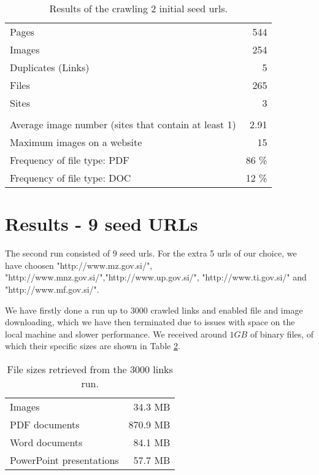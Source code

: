 \documentclass[9pt]{IEEEtran}
\begin{document}
\begin{table}[H]
    \begin{center}
    \caption{Results of the crawling 2 initial seed urls.}
        \begin{tabular}{ l | r }
        Pages & 544 \\
        Images & 254 \\
        Duplicates (Links) & 5 \\
        Files & 265 \\
        Sites & 3 \\
        \hline \\
        Average image number (sites that contain at least 1) & 2.91 \\
        Maximum images on a website & 15 \\
        Frequency of file type: PDF & 86 \% \\
        Frequency of file type: DOC & 12 \% \\
        \end{tabular}
    \label{tab:results2}
    \end{center}
\end{table}
\section{Results - 9 seed URLs}\label{sec:results2}
The second run consisted of 9 seed urls. For the extra 5 urls of our choice, we have choosen "http://www.mz.gov.si/", "http://www.mnz.gov.si/","http://www.up.gov.si/", "http://www.ti.gov.si/" and "http://www.mf.gov.si/". 

We have firstly done a run up to 3000 crawled links and enabled file and image downloading, which we have then terminated due to issues with space on the local machine and slower performance. We received around $1GB$ of binary files, of which their specific sizes are shown in Table \ref{tab:results_files}.

\begin{table}[H]
    \begin{center}
    \caption{File sizes retrieved from the 3000 links run.}
        \begin{tabular}{ l | r }
        Images & 34.3 MB \\
        PDF documents & 870.9 MB \\
        Word documents & 84.1 MB \\
        PowerPoint presentations & 57.7 MB \\
        \end{tabular}
    \label{tab:results_files}
    \end{center}
\end{table}
\end{document}
